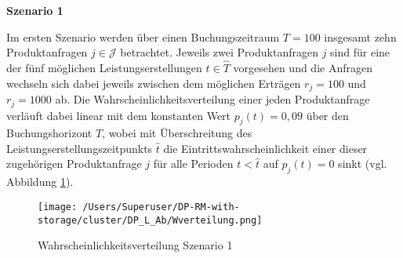 \textbf{Szenario 1}

Im ersten Szenario werden über einen Buchungszeitraum $T=100$ insgesamt zehn Produktanfragen $j\in\mathcal{J}$ betrachtet. Jeweils zwei Produktanfragen $j$ sind für eine der fünf möglichen Leistungserstellungen $\hat t\in\hat T$ vorgesehen und die Anfragen wechseln sich dabei jeweils zwischen dem möglichen Erträgen $r_j=100$ und $r_j=1000$ ab. Die Wahrscheinlichkeitsverteilung einer jeden Produktanfrage verläuft dabei linear mit dem konstanten Wert $p_j(t)=0,09$ über den Buchungshorizont $T$, wobei mit Überschreitung des Leistungserstellungszeitpunkts $\hat t$ die Eintrittswahrscheinlichkeit einer dieser zugehörigen Produktanfrage $j$ für alle Perioden $t<\hat t$ auf $p_j(t)=0$ sinkt (vgl. Abbildung \ref{SB1}).

\begin{figure}[h!]
  \begin{center}
    \texttt{[image: /Users/Superuser/DP-RM-with-storage/cluster/DP\_L\_Ab/Wverteilung.png]}
    \caption{Wahrscheinlichkeitsverteilung Szenario 1}  \label{SB1}
  \end{center}
\end{figure}

